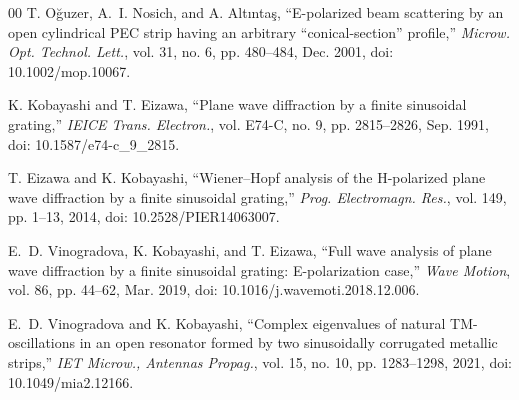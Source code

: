 \documentclass[conference]{IEEEtran}
\begin{document}
\begin{thebibliography}{00}
T. O\u{g}uzer, A.~I. Nosich, and A. Alt\i nta\c{s}, ``E-polarized beam
scattering by an open cylindrical PEC strip having an arbitrary
``conical-section'' profile,'' \emph{Microw. Opt. Technol. Lett.}, vol. 31,
no. 6, pp. 480--484, Dec. 2001, doi: 10.1002/mop.10067.

K. Kobayashi and T. Eizawa, ``Plane wave diffraction by a finite sinusoidal
grating,'' \emph{IEICE Trans. Electron.}, vol. E74-C, no. 9, pp. 2815--2826,
Sep. 1991, doi: 10.1587/e74-c\_9\_2815.

T. Eizawa and K. Kobayashi, ``Wiener--Hopf analysis of the H-polarized plane
wave diffraction by a finite sinusoidal grating,'' \emph{Prog.
Electromagn. Res.}, vol. 149, pp. 1--13, 2014,
doi: 10.2528/PIER14063007.

{}
E.~D. Vinogradova, K. Kobayashi, and T. Eizawa, ``Full wave analysis of plane
wave diffraction by a finite sinusoidal grating: E-polarization case,''
\emph{Wave Motion}, vol. 86, pp. 44--62, Mar. 2019,
doi: 10.1016/j.wavemoti.2018.12.006.

E.~D. Vinogradova and K. Kobayashi, ``Complex eigenvalues of natural
TM-oscillations in an open resonator formed by two sinusoidally corrugated
metallic strips,'' \emph{IET Microw., Antennas Propag.}, vol. 15, no. 10,
pp. 1283--1298, 2021, doi: 10.1049/mia2.12166.

\end{thebibliography}
\end{document}
